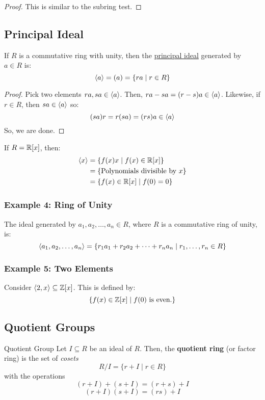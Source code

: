 \documentclass[letterpaper]{article}
\begin{document}
\begin{mdframed}[]
    \begin{proof}
        This is similar to the subring test.
    \end{proof}
\end{mdframed}

\subsection{Principal Ideal}
If $R$ is a commutative ring with unity, then the \underline{principal ideal} generated by $a \in R$ is:
\[\langle a \rangle = (a) = \{ra \mid r \in R\}\]

\begin{mdframed}[]
    \begin{proof}
        Pick two elements $ra, sa \in \langle a \rangle$. Then, $ra - sa = (r - s)a \in \langle a \rangle$. Likewise, if $r \in R$, then $sa \in \langle a \rangle$ so:
        \[(sa)r = r(sa) = (rs)a \in \langle a \rangle\]
        So, we are done. 
    \end{proof}
\end{mdframed}

If $R = \mathbb{R}[x]$, then:
\begin{equation*}
    \begin{aligned}
        \langle x \rangle &= \{f(x)x \mid f(x) \in \mathbb{R}[x]\} \\ 
            &= \{\text{Polynomials divisible by } x\} \\
            &= \{f(x) \in \mathbb{R}[x] \mid f(0) = 0\}
    \end{aligned}
\end{equation*}

\subsubsection{Example 4: Ring of Unity}
The ideal generated by $a_1, a_2, \dots, a_n \in R$, where $R$ is a commutative ring of unity, is:
\[\langle a_1, a_2, \dots, a_n \rangle = \{r_1 a_1 + r_2 a_2 + \dots + r_n a_n \mid r_1, \dots, r_n \in R\}\]

\subsubsection{Example 5: Two Elements}
Consider $\langle 2, x \rangle \subseteq \mathbb{Z}[x]$. This is defined by: 
\[\{f(x) \in \mathbb{Z}[x] \mid f(0) \text{ is even.}\}\]

\subsection{Quotient Groups}
\begin{definition}{Quotient Group}{}
    Let $I \subseteq R$ be an ideal of $R$. Then, the \textbf{quotient ring} (or factor ring) is the set of \emph{cosets}
    \[R / I = \{r + I \mid r \in R\}\]
    with the operations
    \[(r + I) + (s + I) = (r + s) + I\]
    \[(r + I)(s + I) = (rs) + I\]
\end{definition}
\end{document}
